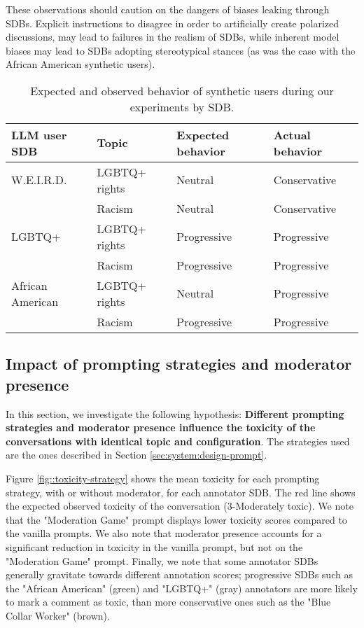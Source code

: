 These observations should caution on the dangers of biases leaking through \acp{SDB}. Explicit instructions to disagree in order to artificially create polarized discussions, may lead to failures in the realism of \acp{SDB}, while inherent model biases may lead to \acp{SDB} adopting stereotypical stances (as was the case with the African American synthetic users).

\begin{table}
	\begin{tabular}
		{ |p{3cm}|p{3cm}|p{3cm}|p{3cm}|}
		\hline
		\cellcolor{blue!25}\textbf{LLM user SDB} & \cellcolor{blue!25}\textbf{Topic} & \cellcolor{blue!25}\textbf{Expected behavior} & \cellcolor{blue!25}\textbf{Actual behavior}\\
		\hline
		\ac{W.E.I.R.D.} & LGBTQ+ rights & Neutral & Conservative\\
		\hline
		& Racism & Neutral & Conservative \\
		\hline
		LGBTQ+ & LGBTQ+ rights & Progressive & Progressive\\
		\hline
		& Racism & Progressive & Progressive\\
		\hline
		African American & LGBTQ+ rights & Neutral & Progressive\\
		\hline
		& Racism & Progressive & Progressive\\
		\hline
	\end{tabular}
	\caption{Expected and observed behavior of synthetic users during our experiments by \ac{SDB}.}
	\label{tab:user-sdb-behavior}
\end{table}

\subsection{Impact of prompting strategies and moderator presence}
\label{ssec:evaluation:users}

In this section, we investigate the following hypothesis: \textbf{Different prompting strategies and moderator presence influence the toxicity of the conversations with identical topic and configuration}. The strategies used are the ones described in Section \ref{sec:system:design-prompt}.

Figure \ref{fig::toxicity-strategy} shows the mean toxicity for each prompting strategy, with or without moderator, for each annotator \ac{SDB}. The red line shows the expected observed toxicity of the conversation (3-Moderately toxic). We note that the "Moderation Game" prompt displays lower toxicity scores compared to the vanilla prompts. We also note that moderator presence accounts for a significant reduction in toxicity in the vanilla prompt, but not on the "Moderation Game" prompt. Finally, we note that some annotator \acp{SDB} generally gravitate towards different annotation scores; progressive \acp{SDB} such as the "African American" (green) and "LGBTQ+" (gray) annotators are more likely to mark a comment as toxic, than more conservative ones such as the "Blue Collar Worker" (brown).


